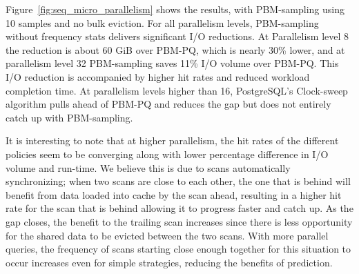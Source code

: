 
 
Figure~\ref{fig:seq_micro_parallelism} shows the results, with PBM-sampling using 10 samples and no bulk eviction.
For all parallelism levels, PBM-sampling without frequency stats delivers significant I/O reductions. At Parallelism level 8 the reduction is about 60 GiB over PBM-PQ, which is nearly 30\% lower, and at parallelism level 32 PBM-sampling saves 11\% I/O volume over PBM-PQ. This I/O reduction is accompanied by higher hit rates and reduced workload completion time. At parallelism levels higher than 16, PostgreSQL's Clock-sweep algorithm pulls ahead of PBM-PQ and reduces the gap but does not entirely catch up with PBM-sampling.

It is interesting to note that at higher parallelism, the hit rates of the different policies seem to be converging along with lower percentage difference in I/O volume and run-time. We believe this is due to scans automatically synchronizing; when two scans are close to each other, the one that is behind will benefit from data loaded into cache by the scan ahead, resulting in a higher hit rate for the scan that is behind allowing it to progress faster and catch up. As the gap closes, the benefit to the trailing scan increases since there is less opportunity for the shared data to be evicted between the two scans. With more parallel queries, the frequency of scans starting close enough together for this situation to occur increases even for simple strategies, reducing the benefits of prediction.


